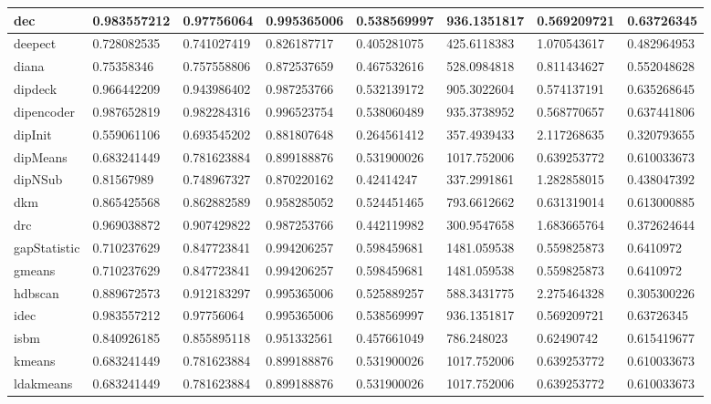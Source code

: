 \begin{table}[H]
\begin{tabular}{|l|l|l|l|l|l|l|l|}
dec & 0.983557212 & 0.97756064 & 0.995365006 & 0.538569997 & 936.1351817 & 0.569209721 & 0.63726345 \\
\hline
deepect & 0.728082535 & 0.741027419 & 0.826187717 & 0.405281075 & 425.6118383 & 1.070543617 & 0.482964953 \\
\hline
diana & 0.75358346 & 0.757558806 & 0.872537659 & 0.467532616 & 528.0984818 & 0.811434627 & 0.552048628 \\
\hline
dipdeck & 0.966442209 & 0.943986402 & 0.987253766 & 0.532139172 & 905.3022604 & 0.574137191 & 0.635268645 \\
\hline
dipencoder & 0.987652819 & 0.982284316 & 0.996523754 & 0.538060489 & 935.3738952 & 0.568770657 & 0.637441806 \\
\hline
dipInit & 0.559061106 & 0.693545202 & 0.881807648 & 0.264561412 & 357.4939433 & 2.117268635 & 0.320793655 \\
\hline
dipMeans & 0.683241449 & 0.781623884 & 0.899188876 & 0.531900026 & 1017.752006 & 0.639253772 & 0.610033673 \\
\hline
dipNSub & 0.81567989 & 0.748967327 & 0.870220162 & 0.42414247 & 337.2991861 & 1.282858015 & 0.438047392 \\
\hline
dkm & 0.865425568 & 0.862882589 & 0.958285052 & 0.524451465 & 793.6612662 & 0.631319014 & 0.613000885 \\
\hline
drc & 0.969038872 & 0.907429822 & 0.987253766 & 0.442119982 & 300.9547658 & 1.683665764 & 0.372624644 \\
\hline
gapStatistic & 0.710237629 & 0.847723841 & 0.994206257 & 0.598459681 & 1481.059538 & 0.559825873 & 0.6410972 \\
\hline
gmeans & 0.710237629 & 0.847723841 & 0.994206257 & 0.598459681 & 1481.059538 & 0.559825873 & 0.6410972 \\
\hline
hdbscan & 0.889672573 & 0.912183297 & 0.995365006 & 0.525889257 & 588.3431775 & 2.275464328 & 0.305300226 \\
\hline
idec & 0.983557212 & 0.97756064 & 0.995365006 & 0.538569997 & 936.1351817 & 0.569209721 & 0.63726345 \\
\hline
isbm & 0.840926185 & 0.855895118 & 0.951332561 & 0.457661049 & 786.248023 & 0.62490742 & 0.615419677 \\
\hline
kmeans & 0.683241449 & 0.781623884 & 0.899188876 & 0.531900026 & 1017.752006 & 0.639253772 & 0.610033673 \\
\hline
ldakmeans & 0.683241449 & 0.781623884 & 0.899188876 & 0.531900026 & 1017.752006 & 0.639253772 & 0.610033673 \\

\end{tabular}
\end{table}

